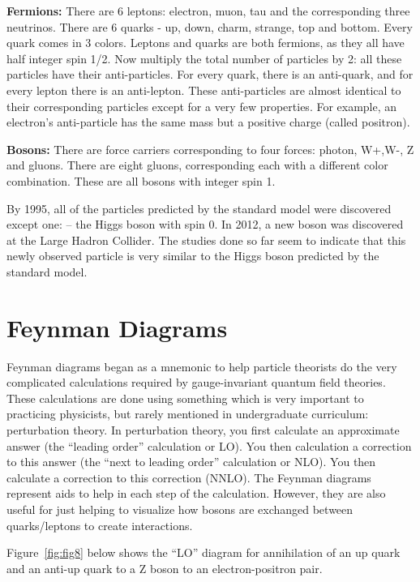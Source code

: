 {\bf Fermions:} There are 6 leptons: electron, muon, tau and the corresponding three neutrinos.
There are 6 quarks - up, down, charm, strange, top and bottom. Every quark comes in 3 colors.
Leptons and quarks are both fermions, as they all have half integer spin 1/2.
Now multiply the total number of particles by 2: all these particles have their anti-particles. For every quark, there is an anti-quark, and for every lepton there is an anti-lepton. These anti-particles are almost identical to their corresponding particles except for a very few properties.  For example, an electron's anti-particle has the same mass but a positive charge (called positron).

{\bf Bosons:} There are force carriers corresponding to four forces: photon, W+,W-,  Z and gluons.  There are eight gluons, corresponding each with a different color combination.  These are all bosons with integer spin 1.

By 1995, all of the particles predicted by the standard model were discovered except one: – the Higgs boson with spin 0. In 2012, a new boson was discovered at the Large Hadron Collider.  The studies done so far seem to indicate that this newly observed particle is very similar to the Higgs boson predicted by the standard model. 


\section{Feynman Diagrams}

Feynman diagrams began as a mnemonic to help particle theorists do the very complicated calculations required by gauge-invariant quantum field theories.  These calculations are done using something which is very important to practicing physicists, but rarely mentioned in undergraduate curriculum: perturbation theory.  In perturbation theory, you first calculate an approximate answer (the “leading order” calculation or LO).  You then calculation a correction to this answer (the “next to leading order” calculation or NLO).  You then calculate a correction to this correction (NNLO).  The Feynman diagrams represent aids to help in each step of the calculation.  However, they are also useful for just helping to visualize how bosons are exchanged between quarks/leptons to create interactions.

Figure~\ref{fig:fig8} below shows the “LO” diagram for annihilation of an up quark and an anti-up quark to a Z boson to an electron-positron pair.


